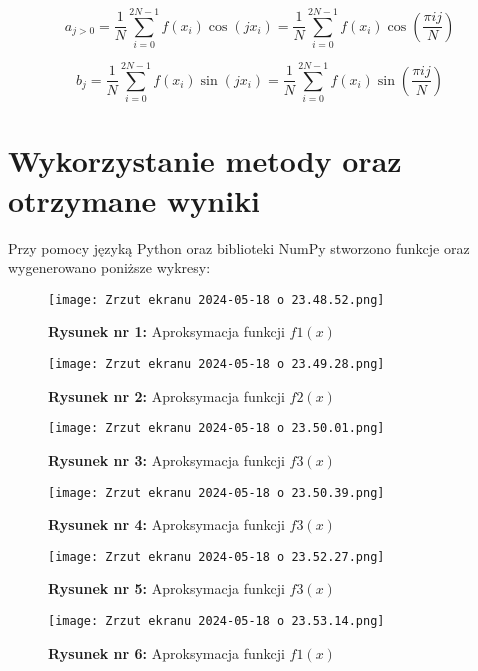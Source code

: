 \documentclass{article}
\begin{document}
\[
a_{j>0} = \frac{1}{N} \sum_{i=0}^{2N-1} f(x_i) \cos(jx_i) = \frac{1}{N} \sum_{i=0}^{2N-1} f(x_i) \cos\left( \frac{\pi i j}{N} \right)
\]

\[
b_j = \frac{1}{N} \sum_{i=0}^{2N-1} f(x_i) \sin(jx_i) = \frac{1}{N} \sum_{i=0}^{2N-1} f(x_i) \sin\left( \frac{\pi i j}{N} \right)
\]

\section{Wykorzystanie metody oraz otrzymane wyniki}
Przy pomocy języką Python oraz biblioteki NumPy stworzono funkcje oraz wygenerowano poniższe wykresy:

\begin{figure}[H]
    \centering
    \texttt{[image: Zrzut ekranu 2024-05-18 o 23.48.52.png]}
    \caption{\textbf{Rysunek nr 1: }Aproksymacja funkcji $f1(x)$}
    \label{fig:enter-label}
\end{figure}

\begin{figure}[H]
    \centering
    \texttt{[image: Zrzut ekranu 2024-05-18 o 23.49.28.png]}
    \caption{\textbf{Rysunek nr 2: }Aproksymacja funkcji $f2(x)$}
    \label{fig:enter-label}
\end{figure}

\begin{figure}[H]
    \centering
    \texttt{[image: Zrzut ekranu 2024-05-18 o 23.50.01.png]}
    \caption{\textbf{Rysunek nr 3: }Aproksymacja funkcji $f3(x)$}
    \label{fig:enter-label}
\end{figure}

\begin{figure}[H]
    \centering
    \texttt{[image: Zrzut ekranu 2024-05-18 o 23.50.39.png]}
    \caption{\textbf{Rysunek nr 4: }Aproksymacja funkcji $f3(x)$}
    \label{fig:enter-label}
\end{figure}

\begin{figure}[H]
    \centering
    \texttt{[image: Zrzut ekranu 2024-05-18 o 23.52.27.png]}
    \caption{\textbf{Rysunek nr 5: }Aproksymacja funkcji $f3(x)$}
    \label{fig:enter-label}
\end{figure}

\begin{figure}[H]
    \centering
    \texttt{[image: Zrzut ekranu 2024-05-18 o 23.53.14.png]}
    \caption{\textbf{Rysunek nr 6: }Aproksymacja funkcji $f1(x)$}
    \label{fig:enter-label}
\end{figure}
\end{document}
